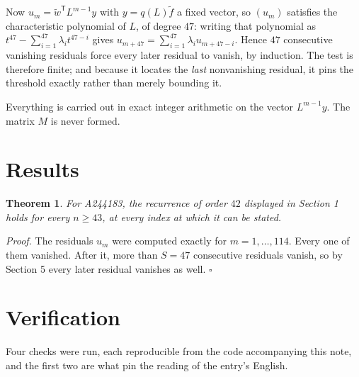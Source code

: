 \documentclass[11pt]{article}
\newtheorem{theorem}{Theorem}
\theoremstyle{definition}
\begin{document}
Now $u_m = \tilde w^{\mathsf T} L^{m-1} y$ with $y = q(L)\tilde f$ a fixed vector, so $(u_m)$ satisfies the characteristic polynomial of $L$, of degree $47$: writing that polynomial as $t^{47} - \sum_{i=1}^{47} \lambda_i t^{47-i}$ gives $u_{m+47} = \sum_{i=1}^{47} \lambda_i u_{m+47-i}$. Hence $47$ consecutive vanishing residuals force every later residual to vanish, by induction. The test is therefore finite; and because it locates the {\itshape last} nonvanishing residual, it pins the threshold exactly rather than merely bounding it.

Everything is carried out in exact integer arithmetic on the vector $L^{m-1}y$. The matrix $M$ is never formed.

\section{Results}

\begin{theorem} For A244183, the recurrence of order $42$ displayed in Section 1 holds for every $n \ge 43$, at every index at which it can be stated.\end{theorem}

{\itshape Proof.} The residuals $u_m$ were computed exactly for $m = 1,\dots,114$. Every one of them vanished. After it, more than $S = 47$ consecutive residuals vanish, so by Section 5 every later residual vanishes as well. $\square$

\section{Verification}

Four checks were run, each reproducible from the code accompanying this note, and the first two are what pin the reading of the entry's English.
\end{document}
